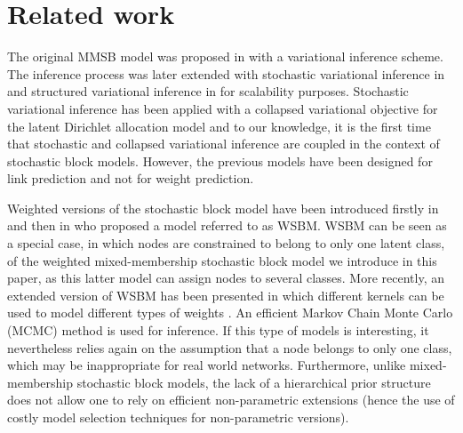 \section{Related work}
\label{sec:rl}




The original MMSB model was proposed in \cite{airoldi2009mixed} with a variational inference scheme. The inference process was later extended with stochastic variational inference in \cite{gopalan2013efficient} and structured variational inference in \cite{kim2013efficient} for scalability purposes. Stochastic variational inference has been applied with a collapsed variational objective for the latent Dirichlet allocation model \cite{foulds2013stochastic} and to our knowledge, it is the first time that stochastic and collapsed variational inference are coupled in the context of stochastic block models. However, the previous models have been designed for link prediction and not for weight prediction.  

Weighted versions of the stochastic block model have been introduced firstly in \cite{mariadassou2010} and then in \cite{aicher2014learning} who proposed a model referred to as WSBM. WSBM can be seen as a special case, in which nodes are constrained to belong to only one latent class, of the weighted mixed-membership stochastic block model we introduce in this paper, as this latter model can assign nodes to several classes. More recently, an extended version of WSBM has been presented in which different kernels can be used to model different types of weights \cite{peixoto2018nonparametric}. An efficient Markov Chain Monte Carlo (MCMC) method is used for inference. If this type of models is interesting, it nevertheless relies again on the assumption that a node belongs to only one class, which may be inappropriate for real world networks. Furthermore, unlike mixed-membership stochastic block models, the lack of a hierarchical prior structure does not allow one to rely on efficient non-parametric extensions (hence the use of costly model selection techniques for non-parametric versions). 

